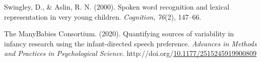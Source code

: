 \documentclass[10pt, letterpaper]{article}
\newenvironment{CSLReferences}%
  {}%
  {\par}
\begin{document}
\begin{CSLReferences}{1}{0}
\leavevmode\hypertarget{ref-Swingley2000}{}%
Swingley, D., \& Aslin, R. N. (2000). {Spoken word recognition and
lexical representation in very young children.} \emph{Cognition},
\emph{76}(2), 147--66.

\leavevmode\hypertarget{ref-TheManyBabiesConsortium2020}{}%
The ManyBabies Consortium. (2020). {Quantifying sources of variability
in infancy research using the infant-directed speech preference}.
\emph{Advances in Methods and Practices in Psychological Science}.
http://doi.org/\href{https://doi.org/10.1177/2515245919900809}{10.1177/2515245919900809}

\end{CSLReferences}


\end{document}

